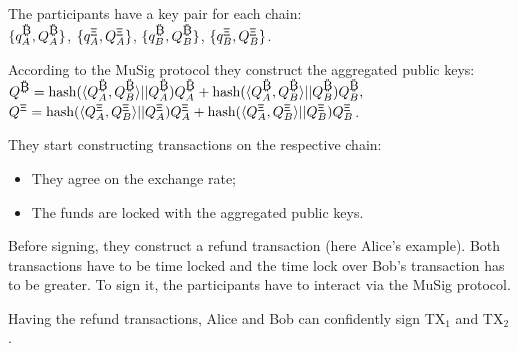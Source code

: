 \documentclass[slidescentered]{beamer}
\begin{document}
\begin{frame}[t]
		 {\centering The participants have a key pair for each chain:\\ $\{q_A^{\small \bitcoin}, Q_A^{\small \bitcoin}\}$, $\{q_A^{\tiny \mathsf{\Xi}}, Q_A^{\tiny \mathsf{\Xi}}\}$, $\{q_B^{\small \bitcoin}, Q_B^{\small \bitcoin}\}$, $\{q_B^{\tiny \mathsf{\Xi}}, Q_B^{\tiny \mathsf{\Xi}}\}$.\par}
		 {\centering According to the MuSig protocol they construct the aggregated public keys:\\ $Q^{\small \bitcoin} = \text{hash}(\langle Q_A^{\small \bitcoin}, Q_B^{\small \bitcoin} \rangle || Q_A^{\small \bitcoin})Q_A^{\small \bitcoin} +  \text{hash}(\langle Q_A^{\small \bitcoin}, Q_B^{\small \bitcoin} \rangle || Q_B^{\small \bitcoin})Q_B^{\small \bitcoin},$\\ 
		$Q^{\tiny \mathsf{\Xi}} = \text{hash}(\langle Q_A^{\tiny \mathsf{\Xi}}, Q_B^{\tiny \mathsf{\Xi}} \rangle || Q_A^{\tiny \mathsf{\Xi}})Q_A^{\tiny \mathsf{\Xi}} +  \text{hash}(\langle Q_A^{\tiny \mathsf{\Xi}}, Q_B^{\tiny \mathsf{\Xi}} \rangle || Q_B^{\tiny \mathsf{\Xi}})Q_B^{\tiny \mathsf{\Xi}}$.\par}
		 {\centering They start constructing transactions on the respective chain: 
		\begin{itemize}
			\item<5-> They agree on the exchange rate;
			\item<6-> The funds are locked with the aggregated public keys. 
		\end{itemize}
		\par}
	 {\centering Before signing, they construct a refund transaction (here Alice's example). Both transactions have to be time locked and the time lock over Bob's transaction has to be greater.
	\only<9> {To sign it, the participants have to interact via the MuSig protocol.}\par}
	 {\centering Having the refund transactions, Alice and Bob can confidently sign TX$_1$ and TX$_2$.
	\par}

\end{frame}
\end{document}
